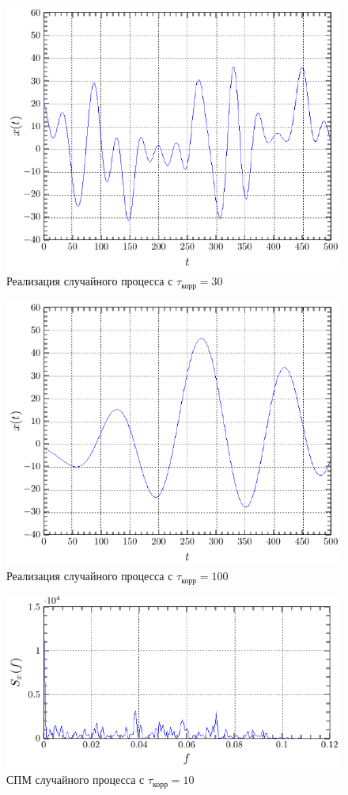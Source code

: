 \documentclass[a4paper,14pt]{extarticle}
\begin{document}
\begin{figure}[H]
    \centering
    \includegraphics[width=0.7\linewidth]{fig/x_from_t_30.pdf}
    \vspace{-0.7em}
    \caption{Реализация случайного процесса с $\tau_\text{корр}=30$}
    \label{fig:t30}
\end{figure}


\begin{figure}[H]
    \centering
    \includegraphics[width=0.7\linewidth]{fig/x_from_t_100.pdf}
    \vspace{-0.7em}
    \caption{Реализация случайного процесса с $\tau_\text{корр}=100$}
    \label{fig:t100}
\end{figure}

\begin{figure}[H]
    \centering
    \includegraphics[width=0.7\linewidth]{fig/S_from_f_10.pdf}
    \vspace{-0.7em}
    \caption{СПМ случайного процесса с $\tau_\text{корр}=10$}
    \label{fig:s10}
\end{figure}
\end{document}

